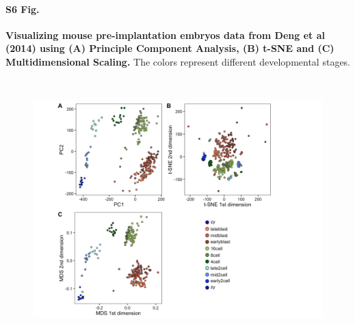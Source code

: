 \documentclass[10pt,letterpaper]{article}
\begin{document}
\paragraph*{S6 Fig.}

\label{figS6}
{\bf Visualizing mouse pre-implantation embryos data from Deng et al (2014) using (A) Principle Component Analysis, (B) t-SNE and (C) Multidimensional Scaling.} The colors represent different developmental stages.
\begin{figure}[ht]
\centering
\includegraphics[height=4in, width=6in]{../../src/figure/deng-other-methods.Rmd/deng-with-legend.jpeg}
\end{figure}
\end{document}
